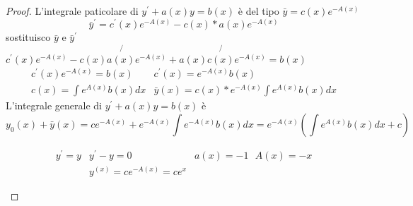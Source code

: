 \begin{proof}
	L'integrale paticolare di $y^\prime+a(x)y=b(x)$ è del tipo
	$\bar{y}=c(x)e^{-A(x)}$
	\begin{equation*}
		\bar{y}^\prime=c^\prime(x)e^{-A(x)}-c(x)*a(x)e^{-A(x)}
	\end{equation*}
	sostituisco $\bar{y}$ e $\bar{y}^\prime$ $c^\prime(x)e^{-A(x)}-
	\not{c(x)a(x)e^{-A(x)}}+\not{a(x)c(x)e^{-A(x)}}=b(x)$
	\begin{eqnarray*}
		c^\prime(x)e^{-A(x)}=b(x) & c^\prime(x)=e^{-A(x)}b(x)\\
		c(x)=\int e^{A(x)}b(x)dx & \bar{y}(x)=c(x)*e^{-A(x)}\int e^{A(x)}b(x)dx
	\end{eqnarray*}
	L'integrale generale di $y^\prime+a(x)y=b(x)$ è
	\begin{equation*}
		y_0(x)+\bar{y}(x)=ce^{-A(x)}+e^{-A(x)}\int
		e^{-A(x)}b(x)dx=e^{-A(x)}\left(\int e^{A(x)}b(x)dx+c\right)
	\end{equation*}
	\begin{esempio}
		\begin{eqnarray*}
			y^\prime =y &y^\prime-y=0 & a(x)=-1\text{ }A(x)=-x\\
			&y^{(x)}=ce^{-A(x)}=ce^x
		\end{eqnarray*}
	\end{esempio}
\end{proof}
